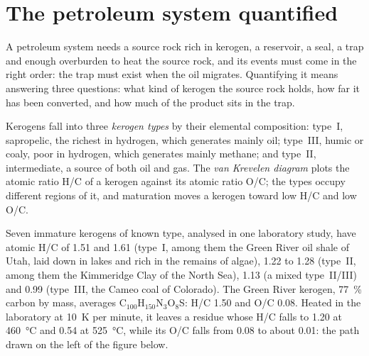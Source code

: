 \section{The petroleum system quantified}\label{sec:b2:energy-geology:petroleum}

A petroleum system needs a source rock rich in kerogen, a reservoir, a seal, a trap and enough
overburden to heat the source rock, and its events must come in the right order: the trap must
exist when the oil migrates. Quantifying it means answering three questions: what kind of kerogen
the source rock holds, how far it has been converted, and how much of the product sits in the
trap.

\begin{definition}\label{def:b2:energy-geology:kerogen}
Kerogens fall into three \emph{kerogen types} by their elemental composition:
type~I, sapropelic, the richest in hydrogen, which generates mainly oil; type~III, humic or coaly,
poor in hydrogen, which generates mainly methane; and type~II, intermediate, a source of both oil
and gas. The \emph{van Krevelen diagram} plots the atomic ratio H/C of
a kerogen against its atomic ratio O/C; the types occupy different regions of it, and maturation
moves a kerogen toward low H/C and low O/C.
\end{definition}

Seven immature kerogens of known type, analysed in one laboratory study, have atomic H/C of
1.51 and 1.61 (type~I, among them the Green River oil shale of Utah, laid down in lakes and rich in
the remains of algae), 1.22 to 1.28 (type~II, among them the Kimmeridge Clay of the North Sea),
1.13 (a mixed type~II/III) and 0.99 (type~III, the Cameo coal of Colorado). The Green River
kerogen, \qty{77}{\percent} carbon by mass, averages C$_{100}$H$_{150}$N$_3$O$_8$S: H/C 1.50 and
O/C 0.08. Heated in the laboratory at \qty{10}{K} per minute, it leaves a residue whose H/C falls to
1.20 at \qty{460}{\celsius} and 0.54 at \qty{525}{\celsius}, while its O/C falls from 0.08 to about
0.01: the path drawn on the left of the figure below.

